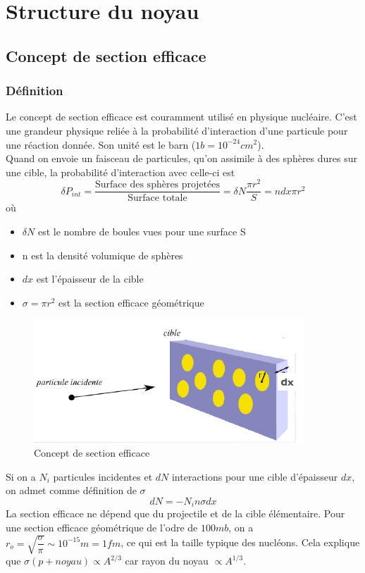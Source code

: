 \section{Structure du noyau}

    \subsection{Concept de section efficace}\label{sec:section_efficace}

    \subsubsection{Définition}

Le concept de section efficace est couramment utilisé en physique nucléaire. C'est une grandeur physique reliée à la probabilité d'interaction d'une particule pour une réaction donnée. Son unité est le barn ($1b=10^{-24}cm^2$).\\[0,2cm]
Quand on envoie un faisceau de particules, qu'on assimile à des sphères dures sur une cible, la probabilité d'interaction avec celle-ci est 
    \[
        \delta P_{int}=\dfrac{\text{Surface des sphères projetées}}{\text{Surface totale}}=\delta N \dfrac{\pi r^2}{S}=n dx \pi r^2
    \]
où \begin{itemize}
        \item $\delta N$ est le nombre de boules vues pour une surface S
        \item n est la densité volumique de sphères
        \item $dx$ est l'épaisseur de la cible
        \item $\sigma=\pi r^2$ est la section efficace géométrique
    \end{itemize}

     \begin{figure}[ht]
        \centering
        \includegraphics[scale=0.75]{Images1/section_efficace.PNG}
        \caption{Concept de section efficace}
    \end{figure}
Si on a $N_i$ particules incidentes et $dN$ interactions pour une cible d'épaisseur $dx$, on admet comme définition de $\sigma$
    \[
        dN=-N_in\sigma dx
    \]
La section efficace ne dépend que du projectile et de la cible élémentaire. Pour une section efficace géométrique de l'odre de $100 mb$, on a $r_o=\sqrt{\dfrac{\sigma}{\pi}}\sim 10^{-15}m=1fm$, ce qui est la taille typique des nucléons. Cela explique que $\sigma(p+noyau)\propto A^{2/3}$ car rayon du noyau $\propto A^{1/3}$.
    
